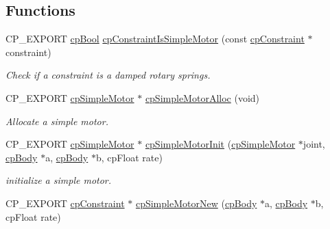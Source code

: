 \subsection*{Functions}
\begin{DoxyCompactItemize}
\item 
\mbox{\label{group__cpSimpleMotor_ga955e2e174d2a348ae20c07d7ea356d42}} 
C\+P\+\_\+\+E\+X\+P\+O\+RT \hyperlink{group__basicTypes_gabc5e752c48f3449ca26ef413ecbd647e}{cp\+Bool} \hyperlink{group__cpSimpleMotor_ga955e2e174d2a348ae20c07d7ea356d42}{cp\+Constraint\+Is\+Simple\+Motor} (const \hyperlink{structcpConstraint}{cp\+Constraint} $\ast$constraint)
\begin{DoxyCompactList}\small\item\em Check if a constraint is a damped rotary springs. \end{DoxyCompactList}\item 
\mbox{\label{group__cpSimpleMotor_gac881d9edcfb7e06ea52de4d722f06ea3}} 
C\+P\+\_\+\+E\+X\+P\+O\+RT \hyperlink{structcpSimpleMotor}{cp\+Simple\+Motor} $\ast$ \hyperlink{group__cpSimpleMotor_gac881d9edcfb7e06ea52de4d722f06ea3}{cp\+Simple\+Motor\+Alloc} (void)
\begin{DoxyCompactList}\small\item\em Allocate a simple motor. \end{DoxyCompactList}\item 
\mbox{\label{group__cpSimpleMotor_ga1dfb654c9b6f70e0962295ae640f9b10}} 
C\+P\+\_\+\+E\+X\+P\+O\+RT \hyperlink{structcpSimpleMotor}{cp\+Simple\+Motor} $\ast$ \hyperlink{group__cpSimpleMotor_ga1dfb654c9b6f70e0962295ae640f9b10}{cp\+Simple\+Motor\+Init} (\hyperlink{structcpSimpleMotor}{cp\+Simple\+Motor} $\ast$joint, \hyperlink{structcpBody}{cp\+Body} $\ast$a, \hyperlink{structcpBody}{cp\+Body} $\ast$b, cp\+Float rate)
\begin{DoxyCompactList}\small\item\em initialize a simple motor. \end{DoxyCompactList}\item 
\mbox{\label{group__cpSimpleMotor_ga000d3a1293d42ab1460b24b35bd99836}} 
C\+P\+\_\+\+E\+X\+P\+O\+RT \hyperlink{structcpConstraint}{cp\+Constraint} $\ast$ \hyperlink{group__cpSimpleMotor_ga000d3a1293d42ab1460b24b35bd99836}{cp\+Simple\+Motor\+New} (\hyperlink{structcpBody}{cp\+Body} $\ast$a, \hyperlink{structcpBody}{cp\+Body} $\ast$b, cp\+Float rate)

\end{DoxyCompactItemize}
